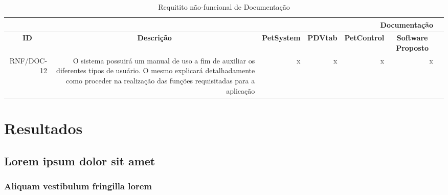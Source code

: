 \documentclass[12pt,openright,twoside,a4paper,english,french,spanish,brazil]{abntex2}
\begin{document}
\begin{table}[htbp]
  \centering
    \begin{tabular}{r|r|r|r|r|rr|}
    \toprule
    \multicolumn{6}{r}{\textbf{Documentação}} \\
    \midrule
    \multicolumn{1}{c}{\textbf{ID}} & \multicolumn{1}{c}{\textbf{Descrição}} & \multicolumn{1}{c}{\textbf{PetSystem}} & \multicolumn{1}{c}{\textbf{PDVtab}} & \multicolumn{1}{c}{\textbf{PetControl}} & \multicolumn{1}{c}{\textbf{Software Proposto}} \\
    RNF/DOC-12 & O sistema possuirá um manual de uso a fim de auxiliar os diferentes tipos de usuário. O mesmo explicará detalhadamente como proceder na realização das funções requisitadas para a aplicação & x & x & x & x \\
    \bottomrule
    \end{tabular}%
      \caption{Requitito não-funcional de Documentação}\label{tab:RNF_DOC}%
\end{table}%









\part{Resultados}

\chapter{Lorem ipsum dolor sit amet}

\section{Aliquam vestibulum fringilla lorem}

\lipsum[1]

\lipsum[2-3]
\end{document}
